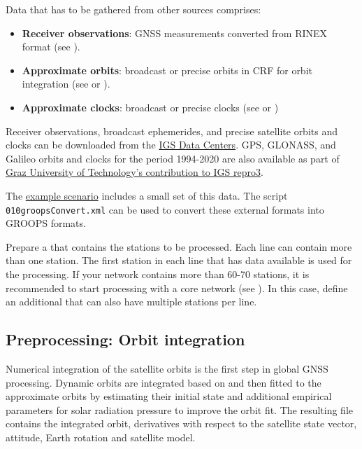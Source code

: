 Data that has to be gathered from other sources comprises:
\begin{itemize}
  \item \textbf{Receiver observations}: GNSS measurements converted from RINEX format (see ).
  \item \textbf{Approximate orbits}: broadcast or precise orbits in CRF for orbit integration (see  or ).
  \item \textbf{Approximate clocks}: broadcast or precise clocks (see  or )
\end{itemize}
Receiver observations, broadcast ephemerides, and precise satellite orbits and clocks can be downloaded from the
\href{https://igs.org/data-products-overview/}{IGS Data Centers}.
GPS, GLONASS, and Galileo orbits and clocks for the period 1994-2020 are also available as part of
\href{https://doi.org/10.3217/dataset-4528-0723-0867}{Graz University of Technology's contribution to IGS repro3}.

The \href{https://ftp.tugraz.at/outgoing/ITSG/groops/scenario/scenarioGnssNetwork.zip}{example scenario} includes a small set of this data.
The script \verb|010groopsConvert.xml| can be used to convert these external formats into GROOPS formats.

Prepare a  that contains the stations to be processed.
Each line can contain more than one station. The first station in each line that has data available is used for the processing.
If your network contains more than 60-70 stations, it is recommended to start processing with a core network (see ).
In this case, define an additional  that can also have multiple stations per line.

\subsection{Preprocessing: Orbit integration}\label{cookbook.gnssNetwork:orbitIntegration}
Numerical integration of the satellite orbits is the first step in global GNSS processing.
Dynamic orbits are integrated based on  and then fitted to the approximate orbits
by estimating their initial state and additional empirical parameters for solar radiation pressure to improve the orbit fit.
The resulting  file contains the integrated orbit, derivatives
with respect to the satellite state vector, attitude, Earth rotation and satellite model.

